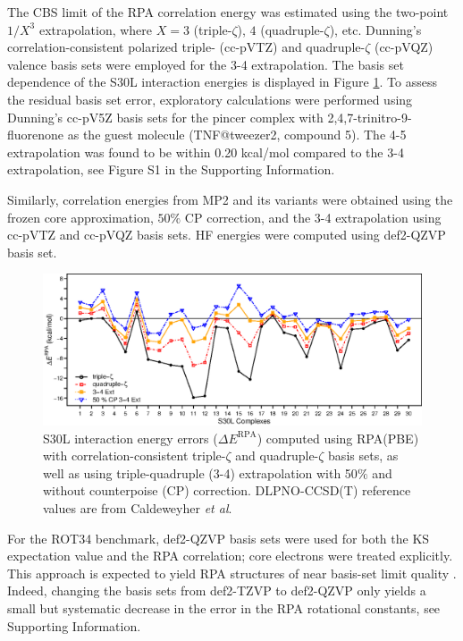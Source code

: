 \documentclass[journal=jctcce,manuscript=article]{achemso}
\begin{document}
The CBS limit of the RPA correlation energy was estimated using the two-point
$1/X^3$ extrapolation, where $X = 3$ (triple-$\zeta$), $4$ (quadruple-$\zeta$),
etc.\cite{Eshuis12JChemPhys136p084105,Halkier98ChemicalPhysicsLetters286p243} Dunning's
correlation-consistent polarized triple- (cc-pVTZ) and quadruple-$\zeta$ (cc-pVQZ) valence basis
sets\cite{Dunning89JChemPhys90p1007,doi:10.1063/1.464303} were employed for
the 3-4 extrapolation. The basis set dependence of the S30L interaction
energies is displayed in Figure \ref{fig:conv}. To assess the residual
basis set error, exploratory calculations were performed using Dunning's
cc-pV5Z basis 
sets\cite{b415208e} for the pincer complex with 2,4,7-trinitro-9-fluorenone
as the guest molecule (TNF@tweezer2, compound 5).\cite{Sure15JChemTheoryComput}
The 4-5 extrapolation was found to be within 0.20 kcal/mol compared to
the 3-4 extrapolation, see Figure S1 in the Supporting
Information. 

Similarly, correlation energies from MP2 and its variants were obtained
using the frozen core approximation, $50\%$ CP correction, and the 3-4 extrapolation 
using cc-pVTZ and cc-pVQZ
basis sets.\cite{Dunning89JChemPhys90p1007,doi:10.1063/1.464303}
HF energies were computed using def2-QZVP
basis set.\cite{Weigend05PhysChemChemPhys7p3297,Weigend03JChemPhys119p12753}


\begin{figure}[hbpt]
  \centering
  \includegraphics{conv_v5}
  \caption{S30L interaction energy errors ($\Delta E^{\text{RPA}}$)
    computed using RPA(PBE) with correlation-consistent triple-$\zeta$ and 
    quadruple-$\zeta$ basis sets, as well as using triple-quadruple (3-4)
    extrapolation with 50$\%$ and without counterpoise (CP) correction. DLPNO-CCSD(T)
    reference values are from Caldeweyher \textit{et al}.\cite{doi:10.1063/1.5090222}}
  \label{fig:conv}
\end{figure}

For the ROT34 benchmark,\cite{C3CP52293H,Risthaus14JComputChem35p1509} 
def2-QZVP basis sets were used for both the KS expectation value and
the RPA correlation; core electrons were treated explicitly. This approach
is expected to yield RPA structures of near basis-set limit quality
\cite{Burow14JChemTheoryComput10p180}. Indeed, changing
the basis sets from def2-TZVP 
to def2-QZVP only yields a small but systematic decrease in the error in
the RPA rotational constants, see Supporting Information.
\end{document}
